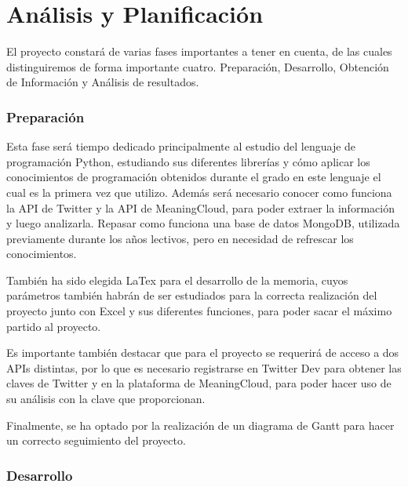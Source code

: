 
\chapter{Análisis y Planificación}

El proyecto constará de varias fases importantes a tener en cuenta, de las cuales distinguiremos de forma importante cuatro. Preparación, Desarrollo, Obtención de Información y Análisis de resultados. 

\subsection{Preparación}

Esta fase será tiempo dedicado principalmente al estudio del lenguaje de programación Python, estudiando sus diferentes librerías y cómo aplicar los conocimientos de programación obtenidos durante el grado en este lenguaje el cual es la primera vez que utilizo. Además será necesario conocer como funciona la API de Twitter y la API de MeaningCloud, para poder extraer la información y luego analizarla. Repasar como funciona una base de datos MongoDB, utilizada previamente durante los años lectivos, pero en necesidad de refrescar los conocimientos. 

También ha sido elegida LaTex para el desarrollo de la memoria, cuyos parámetros también habrán de ser estudiados para la correcta realización del proyecto junto con Excel y sus diferentes funciones, para poder sacar el máximo partido al proyecto. 

Es importante también destacar que para el proyecto se requerirá de acceso a dos APIs distintas, por lo que es necesario registrarse en Twitter Dev para obtener las claves de Twitter y en la plataforma de MeaningCloud, para poder hacer uso de su análisis con la clave que proporcionan.

Finalmente, se ha optado por la realización de un diagrama de Gantt para hacer un correcto seguimiento del proyecto. 

\subsection{Desarrollo}

